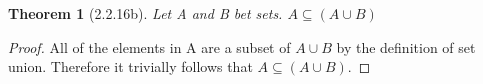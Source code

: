 \documentclass[a4paper, 12pt]{article}
\theoremstyle{plain}
\newtheorem*{theorem*}{Theorem}
\begin{document}
	
	\begin{theorem*}[2.2.16b]
		Let A and B bet sets. $A \subseteq (A \cup B)$
	\end{theorem*}
	
	\begin{proof}
		All of the elements in A are a subset of $A \cup B$ by the definition of set union. 
		Therefore it trivially follows that $A \subseteq (A \cup B)$.
	\end{proof}
\end{document}
